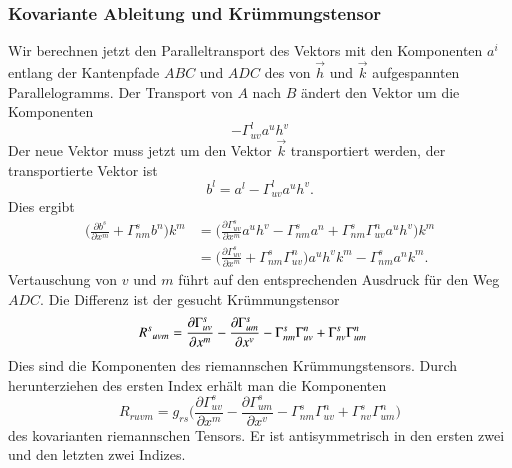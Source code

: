 \subsubsection{Kovariante Ableitung und Krümmungstensor}
Wir berechnen jetzt den Paralleltransport des Vektors mit den
Komponenten $a^i$ entlang der Kantenpfade $ABC$ und $ADC$ 
des von $\vec{h}$ und $\vec{k}$ aufgespannten Parallelogramms.
Der Transport von $A$ nach $B$ ändert den Vektor um die Komponenten
\[
-\Gamma^l_{uv} a^u h^v 
\]
Der neue Vektor muss jetzt um den Vektor $\vec{k}$ transportiert
werden, der transportierte Vektor ist
\[
b^l
=
a^l-\Gamma^l_{uv} a^u h^v.
\]
Dies ergibt
\begin{align*}
\biggl(
\frac{\partial b^s}{\partial x^m}
+
\Gamma^s_{nm} b^n
\biggr)
k^m
&=
\biggl(
\frac{\partial \Gamma^s_{uv}}{\partial x^m}
a^u
h^v
-
\Gamma^s_{nm}
a^n
+
\Gamma^s_{nm} \Gamma^n_{uv}
a^u
h^v
\biggr)
k^m
\\
&=
\biggl(
\frac{\partial \Gamma^s_{uv}}{\partial x^m}
+
\Gamma^s_{nm}\Gamma^n_{uv}
\biggr)
a^u
h^v k^m
-
\Gamma^s_{nm}a^nk^m.
\end{align*}
Vertauschung von $v$ und $m$ führt auf den entsprechenden
Ausdruck für den Weg $ADC$.
Die Differenz ist der gesucht Krümmungstensor
\begin{align}
R^s\mathstrut_{uvm}
&=
\frac{\partial\Gamma^s_{uv}}{\partial x^m}
-
\frac{\partial\Gamma^s_{um}}{\partial x^v}
-
\Gamma^s_{nm}\Gamma^n_{uv}
+
\Gamma^s_{nv}\Gamma^n_{um}
\label{buch:kruemmung:kruemmung:eqn:Rm}
\end{align}
Dies sind die Komponenten des riemannschen Krümmungstensors.
Durch herunterziehen des ersten Index erhält man die Komponenten
\begin{equation}
R_{ruvm}
=
g_{rs}
\biggl(
\frac{\partial\Gamma^s_{uv}}{\partial x^m}
-
\frac{\partial\Gamma^s_{um}}{\partial x^v}
-
\Gamma^s_{nm}\Gamma^n_{uv}
+
\Gamma^s_{nv}\Gamma^n_{um}
\biggr)
\label{buch:kruemmung:kruemmung:eqn:Rmkovariant}
\end{equation}
des kovarianten riemannschen Tensors.
Er ist antisymmetrisch in den ersten zwei und den letzten zwei
Indizes.

